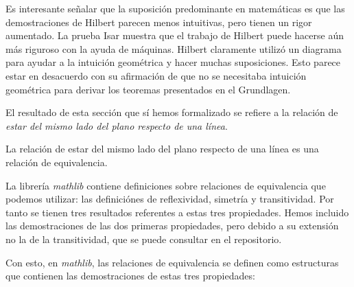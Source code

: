 \begin{displayquote}
	Es interesante señalar que la suposición predominante en matemáticas es que
	las demostraciones de Hilbert parecen menos intuitivas, pero tienen un rigor
	aumentado. La prueba Isar muestra que el trabajo de Hilbert puede hacerse
	aún más riguroso con la ayuda de máquinas. Hilbert claramente utilizó un
	diagrama para ayudar a la intuición geométrica y hacer muchas suposiciones.
	Esto parece estar en desacuerdo con su afirmación de que no se necesitaba
	intuición geométrica para derivar los teoremas presentados en el Grundlagen.
\end{displayquote}

El resultado de esta sección que sí hemos formalizado se refiere a la relación
de \textit{estar del mismo lado del plano respecto de una línea}.

\begin{prop}
	La relación de estar del mismo lado del plano respecto de una línea es una
	relación de equivalencia.
\end{prop}

La librería \textit{mathlib} contiene definiciones sobre relaciones de
equivalencia que podemos utilizar: las definiciónes de reflexividad, simetría y
transitividad. Por tanto se tienen tres resultados referentes a estas tres
propiedades. Hemos incluido las demostraciones de las dos primeras propiedades,
pero debido a su extensión no la de la transitividad, que se puede consultar en
el repositorio.


Con esto, en \textit{mathlib}, las relaciones de equivalencia se definen como
estructuras que contienen las demostraciones de estas tres propiedades:






